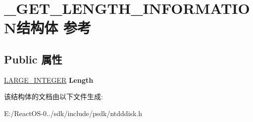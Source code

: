 \hypertarget{struct___g_e_t___l_e_n_g_t_h___i_n_f_o_r_m_a_t_i_o_n}{}\section{\+\_\+\+G\+E\+T\+\_\+\+L\+E\+N\+G\+T\+H\+\_\+\+I\+N\+F\+O\+R\+M\+A\+T\+I\+O\+N结构体 参考}
\label{struct___g_e_t___l_e_n_g_t_h___i_n_f_o_r_m_a_t_i_o_n}
\subsection*{Public 属性}
\begin{DoxyCompactItemize}
\item 
\mbox{\label{struct___g_e_t___l_e_n_g_t_h___i_n_f_o_r_m_a_t_i_o_n_a0ce42efbd8f33bf064ba280a647853ab}} 
\hyperlink{union___l_a_r_g_e___i_n_t_e_g_e_r}{L\+A\+R\+G\+E\+\_\+\+I\+N\+T\+E\+G\+ER} {\bfseries Length}
\end{DoxyCompactItemize}


该结构体的文档由以下文件生成\+:\begin{DoxyCompactItemize}
\item 
E\+:/\+React\+O\+S-\/0../sdk/include/psdk/ntdddisk.\+h\end{DoxyCompactItemize}
